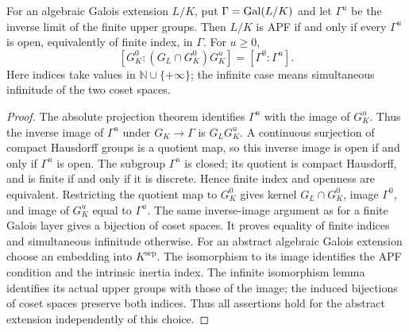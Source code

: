 \begin{proposition}
\label{fw:galois-apf-criterion}
\leanok
For an algebraic Galois extension $L/K$, put $\Gamma=\operatorname{Gal}(L/K)$ and
let $\Gamma^u$ be the inverse limit of the finite upper groups.
Then $L/K$ is APF if and only if every $\Gamma^u$ is open, equivalently
of finite index, in $\Gamma$. For $u\geq0$,
\[
 [G_K^0:(G_L\cap G_K^0)G_K^u]=[\Gamma^0:\Gamma^u].
\]
Here indices take values in $\mathbb N\cup\{+\infty\}$; the infinite
case means simultaneous infinitude of the two coset spaces.
\end{proposition}
\begin{proof}
The absolute projection theorem identifies $\Gamma^u$ with the image
of $G_K^u$. Thus the inverse image of $\Gamma^u$ under
$G_K\to\Gamma$ is $G_LG_K^u$. A continuous surjection of compact
Hausdorff groups is a quotient map, so this inverse image is open if
and only if $\Gamma^u$ is open. The subgroup $\Gamma^u$ is closed;
its quotient is compact Hausdorff, and is finite if and only if it is
discrete. Hence finite index and openness are equivalent.
Restricting the quotient map to $G_K^0$ gives kernel $G_L\cap G_K^0$,
image $\Gamma^0$, and image of $G_K^u$ equal to $\Gamma^u$.
The same inverse-image argument as for a finite Galois layer gives a
bijection of coset spaces. It proves equality of finite indices and
simultaneous infinitude otherwise.
For an abstract algebraic Galois extension choose an embedding into
$K^{\mathrm{sep}}$. The isomorphism to its image identifies the APF
condition and the intrinsic inertia index. The infinite isomorphism
lemma identifies its actual upper groups with those of the image;
the induced bijections of coset spaces preserve both indices. Thus all
assertions hold for the abstract extension independently of this choice.
\end{proof}

